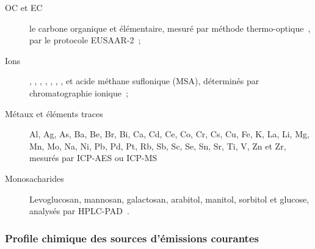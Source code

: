 \begin{description}
    \item[OC et EC] le carbone organique et élémentaire, mesuré par méthode
        thermo-optique~\autocite[Sunset Lab. Analyser]{birchElemental1996}, par le
        protocole EUSAAR-2~\autocite{cavalliStandardised2010,cenAmbient2017a};

    \item[Ions] , , , , , ,
        ,  et acide méthane suflonique (MSA), déterminés par
        chromatographie ionique~\autocite{jaffrezoSeasonal2005,cenAmbient2017b};

    \item[Métaux et éléments traces] Al, Ag, As, Ba, Be, Br, Bi, Ca, Cd, Ce, Co, Cr, Cs,
        Cu, Fe, K, La, Li, Mg, Mn, Mo, Na, Ni, Pb, Pd, Pt, Rb, Sb, Sc, Se, Sn, Sr, Ti, V,
        Zn et Zr, mesurés par ICP-AES ou
        ICP-MS~\autocite{allemanPM102010,mbengueSizedistributed2014,cenAmbient2005}

    \item[Monosacharides] Levoglucosan, mannosan, galactosan, arabitol, manitol, sorbitol
        et glucose, analysés par
        HPLC-PAD~\autocite{piotQuantification2012,wakedSource2014}.

\end{description}

\subsubsection{Profile chimique des sources d'émissions courantes}%
\label{ssub:profile_chimique_des_sources_d_émissions_courantes}

